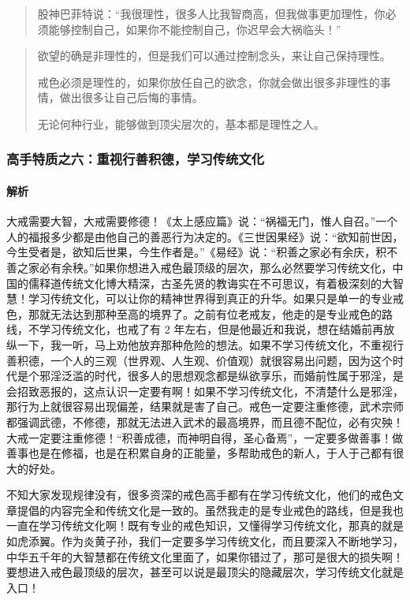 \begin{quote}
    股神巴菲特说：“我很理性，很多人比我智商高，但我做事更加理性，你必须能够控制自己，如果你不能控制自己，你迟早会大祸临头！”
\end{quote}

\begin{quotation}
    欲望的确是非理性的，但是我们可以通过控制念头，来让自己保持理性。

    戒色必须是理性的，如果你放任自己的欲念，你就会做出很多非理性的事情，做出很多让自己后悔的事情。

    无论何种行业，能够做到顶尖层次的，基本都是理性之人。
\end{quotation}

\subsubsection{高手特质之六：重视行善积德，学习传统文化}

\paragraph{解析} 大戒需要大智，大戒需要修德！《太上感应篇》说：“祸福无门，惟人自召。”一个人的福报多少都是由他自己的善恶行为决定的。《三世因果经》说：“欲知前世因，今生受者是，欲知后世果，今生作者是。”《易经》说：“积善之家必有余庆，积不善之家必有余秧。”如果你想进入戒色最顶级的层次，那么必然要学习传统文化，中国的儒释道传统文化博大精深，古圣先贤的教诲实在不可思议，有着极深刻的大智慧！学习传统文化，可以让你的精神世界得到真正的升华。如果只是单一的专业戒色，那就无法达到那种至高的境界了。之前有位老戒友，他走的是专业戒色的路线，不学习传统文化，也戒了有 2 年左右，但是他最近和我说，想在结婚前再放纵一下，我一听，马上劝他放弃那种危险的想法。如果不学习传统文化，不重视行善积德，一个人的三观（世界观、人生观、价值观）就很容易出问题，因为这个时代是个邪淫泛滥的时代，很多人的思想观念都是纵欲享乐，而婚前性属于邪淫，是会招致恶报的，这点认识一定要有啊！如果不学习传统文化，不清楚什么是邪淫，那行为上就很容易出现偏差，结果就是害了自己。戒色一定要注重修德，武术宗师都强调武德，不修德，那就无法进入武术的最高境界，而且德不配位，必有灾殃！大戒一定要注重修德！“积善成德，而神明自得，圣心备焉”，一定要多做善事！做善事也是在修福，也是在积累自身的正能量，多帮助戒色的新人，于人于己都有很大的好处。

不知大家发现规律没有，很多资深的戒色高手都有在学习传统文化，他们的戒色文章提倡的内容完全和传统文化是一致的。虽然我走的是专业戒色的路线，但是我也一直在学习传统文化啊！既有专业的戒色知识，又懂得学习传统文化，那真的就是如虎添翼。作为炎黄子孙，我们一定要多学习传统文化，而且要深入不断地学习，中华五千年的大智慧都在传统文化里面了，如果你错过了，那可是很大的损失啊！要想进入戒色最顶级的层次，甚至可以说是最顶尖的隐藏层次，学习传统文化就是入口！


